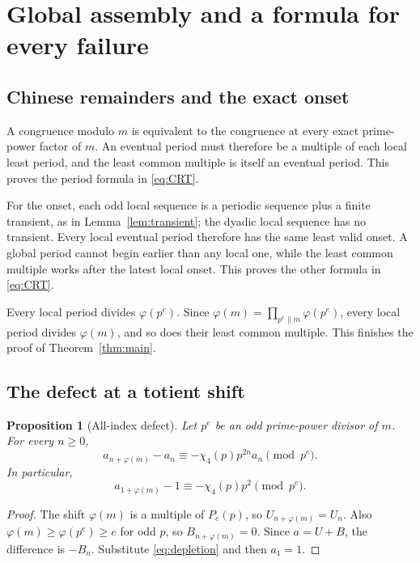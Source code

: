 \documentclass[11pt,a4paper]{article}
\numberwithin{equation}{section}
\newtheorem{proposition}[theorem]{Proposition}
\theoremstyle{definition}
\begin{document}
\section{Global assembly and a formula for every failure}
\label{sec:global}

\subsection{Chinese remainders and the exact onset}

A congruence modulo $m$ is equivalent to the congruence at every exact
prime-power factor of $m$. An eventual period must therefore be a
multiple of each local least period, and the least common multiple is
itself an eventual period. This proves the period formula in
\eqref{eq:CRT}.

For the onset, each odd local sequence is a periodic sequence plus a
finite transient, as in Lemma~\ref{lem:transient}; the dyadic local sequence
has no transient. Every local eventual period therefore has the same
least valid onset. A global period cannot begin earlier than any local
one, while the least common multiple works after the latest local onset.
This proves the other formula in \eqref{eq:CRT}.

Every local period divides $\varphi(p^e)$. Since
$\varphi(m)=\prod_{p^e\parallel m}\varphi(p^e)$, every local period
divides $\varphi(m)$, and so does their least common multiple.
This finishes the proof of Theorem~\ref{thm:main}.

\subsection{The defect at a totient shift}

\begin{proposition}[All-index defect]\label{prop:defect}
Let $p^e$ be an odd prime-power divisor of $m$. For every $n\ge0$,
\begin{equation}\label{eq:defect}
a_{n+\varphi(m)}-a_n
\equiv-\chi_4(p)p^{2n}a_n\pmod{p^e}.
\end{equation}
In particular,
\begin{equation}\label{eq:firstdefect}
a_{1+\varphi(m)}-1\equiv-\chi_4(p)p^2\pmod{p^e}.
\end{equation}
\end{proposition}

\begin{proof}
The shift $\varphi(m)$ is a multiple of $P_e(p)$, so
$U_{n+\varphi(m)}=U_n$. Also $\varphi(m)\ge\varphi(p^e)\ge e$ for
odd $p$, so $B_{n+\varphi(m)}=0$. Since $a=U+B$, the difference is
$-B_n$. Substitute \eqref{eq:depletion} and then $a_1=1$.
\end{proof}
\end{document}
